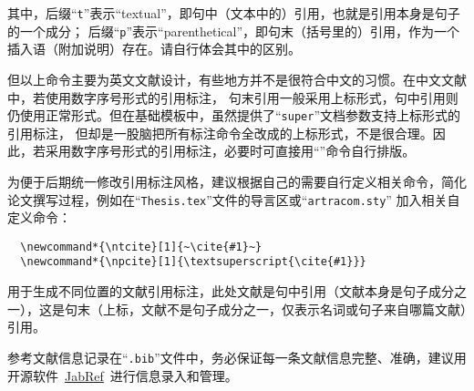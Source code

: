 其中，后缀“\texttt{t}”表示“textual”，即句中（文本中的）引用，也就是引用本身是句子的一个成分；
后缀“\texttt{p}”表示“parenthetical”，即句末（括号里的）引用，作为一个插入语（附加说明）存在。请自行体会其中的区别。

但以上命令主要为英文文献设计，有些地方并不是很符合中文的习惯。在中文文献中，若使用数字序号形式的引用标注，
句末引用一般采用上标形式，句中引用则仍使用正常形式。但在基础模板中，虽然提供了“\texttt{super}”文档参数支持上标形式的引用标注，
但却是一股脑把所有标注命令全改成的上标形式，不是很合理。因此，若采用数字序号形式的引用标注，必要时可直接用“”命令自行排版。

为便于后期统一修改引用标注风格，建议根据自己的需要自行定义相关命令，简化论文撰写过程，例如在“\texttt{Thesis.tex}”文件的导言区或“\texttt{artracom.sty}”
加入相关自定义命令：{\linespread{1.1}
\begin{verbatim}
  \newcommand*{\ntcite}[1]{~\cite{#1}~}
  \newcommand*{\npcite}[1]{\textsuperscript{\cite{#1}}}
\end{verbatim}}
用于生成不同位置的文献引用标注，此处文献是句中引用（文献本身是句子成分之一），这是句末（上标，文献不是句子成分之一，仅表示名词或句子来自哪篇文献）引用。

参考文献信息记录在“\texttt{.bib}”文件中，务必保证每一条文献信息完整、准确，建议用开源软件~\href{https://www.jabref.org/}{JabRef}~进行信息录入和管理。
